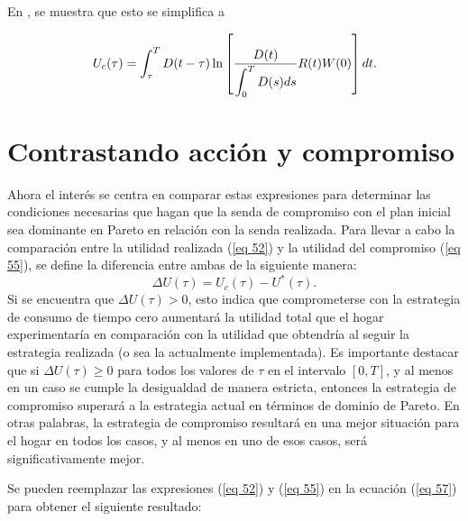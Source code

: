 \noindent En \parencite{feigenbaum2021deviation}, se muestra que esto se simplifica a

\begin{equation}
\label{eq 56}
U_c(\tau)=\displaystyle \int_\tau^T D(t-\tau) \ln \left[\dfrac{D(t)}{\displaystyle \int_0^T D(s) d s} R(t) W(0)\right] d t.
\end{equation}


\section{Contrastando acción y compromiso}
Ahora el interés se centra en comparar estas expresiones para determinar las condiciones necesarias que hagan que la senda de compromiso con el plan inicial sea dominante en Pareto en relación con la senda realizada. Para llevar a cabo la comparación entre la utilidad realizada (\ref{eq 52}) y la utilidad del compromiso (\ref{eq 55}), se define la diferencia entre ambas de la siguiente manera:
\begin{equation}
\label{eq 57}
\Delta U(\tau)=U_c(\tau)- U^*(\tau).    
\end{equation}
Si se encuentra que $\Delta U(\tau) > 0$, esto indica que comprometerse con la estrategia de consumo de tiempo cero aumentará la utilidad total que el hogar experimentaría en comparación con la utilidad que obtendría al seguir la estrategia realizada (o sea la actualmente implementada). Es importante destacar que si $\Delta U(\tau) \geq 0$ para todos los valores de $\tau$ en el intervalo $[0, T]$, y al menos en un caso se cumple la desigualdad de manera estricta, entonces la estrategia de compromiso superará a la estrategia actual en términos de dominio de Pareto. En otras palabras, la estrategia de compromiso resultará en una mejor situación para el hogar en todos los casos, y al menos en uno de esos casos, será significativamente mejor.
 
Se pueden reemplazar las expresiones (\ref{eq 52}) y (\ref{eq 55}) en la ecuación (\ref{eq 57}) para obtener el siguiente resultado:

